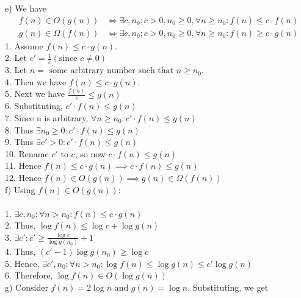 \documentclass[12pt]{report}
\newcommand{\no}{\noindent}
\newcommand{\tab}{\hspace*{.6cm}}
\begin{document}
	\no e) We have 
	\begin{align*}
	f(n) \in O(g(n)) &\iff \exists c, n_0;c > 0, n_0 \geq 0, \forall n \geq n_0: f(n) \leq c \cdot f(n)\\
	g(n) \in \Omega(f(n)) &\iff \exists c, n_0;c > 0, n_0 \geq 0, \forall n \geq n_0: f(n) \geq c \cdot g(n)
	\end{align*}
	\tab 1. Assume $f(n) \leq c \cdot g(n)$.\\
	\tab 2. Let $c' = \frac{1}{c} \left(\text{since } c \neq 0\right)$\\
	\tab 3. Let $n = \text{ some arbitrary number such that } n \geq n_0$.\\
	\tab 4. Then we have $f(n) \leq c \cdot g(n)$.\\
	\tab 5. Next we have $\frac{f(n)}{c} \leq g(n)$\\
	\tab 6. Substituting, $c' \cdot f(n) \leq g(n)$\\
	\tab 7. Since n is arbitrary, $\forall n \geq n_0: c' \cdot f(n) \leq g(n)$\\
	\tab 8. Thus $\exists n_0 \geq 0 : c' \cdot f(n) \leq g(n)$\\
	\tab 9. Thus $\exists c' >0 : c' \cdot f(n) \leq g(n)$\\
	\tab 10. Rename $c'$ to $c$, so now $c \cdot f(n) \leq g(n)$\\
	\tab 11. Hence $f(n) \leq c \cdot g(n) \implies c \cdot f(n) \leq g(n)$\\
	\tab 12. Hence $f(n) \in O(g(n)) \implies g(n) \in \Omega(f(n))$\\
	
	\no f) Using $f(n) \in O(g(n))$:\\
	\\
	\tab 1. $\exists c, n_0; \forall n > n_0 : f(n) \leq c \cdot g(n)$\\
	\tab 2. Thus, $\log{f(n)} \leq \log{c} + \log{g(n)}$\\
	\tab 3. $\exists c' : c' \geq \frac{\log{c}}{\log{g(n_0)}} + 1$\\
	\tab 4. Thus, $(c' - 1)\log{g(n_0)} \geq \log{c}$\\
	\tab 5. Hence, $\exists c', n_0; \forall n > n_0:\log{f(n)} \leq \log{g(n)} \leq c'\log{g(n)}$\\
	\tab 6. Therefore, $\log{f(n)} \in O(\log{g(n)})$\\
	
	\no g) Consider $f(n) = 2\log{n} \text{ and } g(n) = \log{n}$. Substituting, we get \\
	
\end{document}

